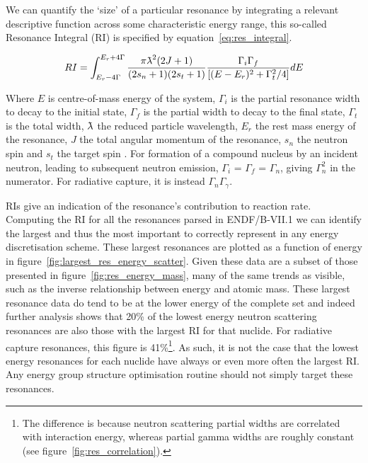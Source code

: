 
We can quantify the `size' of a particular resonance by integrating a relevant descriptive function across some characteristic energy range, this so-called Resonance Integral (RI) is specified by equation~\ref{eq:res_integral}. 

\begin{equation}
  \label{eq:res_integral}
  RI = \int_{E_{r}-4\Gamma}^{E_{r}+4\Gamma} \frac{\pi\lambdabar^{2}(2J + 1)}{(2s_{n} + 1)(2s_{t} + 1)}  \frac{\Gamma_{i}\Gamma_{f}}{[(E-E_{r})^{2} + \Gamma^{2}_{t}/4]} dE
\end{equation}

Where $E$ is centre-of-mass energy of the system, $\Gamma_{i}$ is the partial resonance width to decay to the initial state, $\Gamma_{f}$ is the partial width to decay to the final state, $\Gamma_{t}$ is the total width, $\lambdabar$ the reduced particle wavelength, $E_{r}$ the rest mass energy of the resonance, $J$ the total angular momentum of the resonance, $s_{n}$ the neutron spin and $s_{t}$ the target spin \cite{Libby2005}. For formation of a compound nucleus by an incident neutron, leading to subsequent neutron emission, $\Gamma_{i}$ = $\Gamma_{f}$ = $\Gamma_{n}$, giving $\Gamma^{2}_{n}$ in the numerator. For radiative capture, it is instead $\Gamma_{n}\Gamma_{\gamma}$. 

RIs give an indication of the resonance's contribution to reaction rate. Computing the RI for all the resonances parsed in ENDF/B-VII.1 we can identify the largest and thus the most important to correctly represent in any energy discretisation scheme. These largest resonances are plotted as a function of energy in figure~\ref{fig:largest_res_energy_scatter}. Given these data are a subset of those presented in figure~\ref{fig:res_energy_mass}, many of the same trends as visible, such as the inverse relationship between energy and atomic mass. These largest resonance data do tend to be at the lower energy of the complete set and indeed further analysis shows that 20\% of the lowest energy neutron scattering resonances are also those with the largest RI for that nuclide. For radiative capture resonances, this figure is 41\%\footnote{The difference is because neutron scattering partial widths are correlated with interaction energy, whereas partial gamma widths are roughly constant (see figure~\ref{fig:res_correlation}).}. As such, it is not the case that the lowest energy resonances for each nuclide have always or even more often the largest RI. Any energy group structure optimisation routine should not simply target these resonances.

